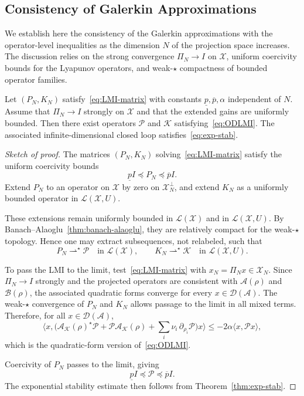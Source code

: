 \documentclass[AMA,Times2COL]{WileyNJDv5}
\begin{document}
\subsection{Consistency of Galerkin Approximations}

We establish here the consistency of the Galerkin approximations with the operator-level inequalities as the dimension $N$ of the projection space increases. The discussion relies on the strong convergence $\Pi_N\to I$ on
$\mathscr{X}$, uniform coercivity bounds for the Lyapunov operators, and weak-$\star$ compactness of bounded operator families.

\begin{theorem}\label{thm:limit}
Let $(P_N,K_N)$ satisfy~\eqref{eq:LMI-matrix} with constants $\underline{p},\overline{p},\alpha$ independent of $N$.
Assume that $\Pi_N\to I$ strongly on $\mathscr{X}$ and that the extended gains are uniformly bounded. Then there exist operators $\mathcal{P}$ and $\mathcal{K}$ satisfying~\eqref{eq:ODLMI}.  
The associated infinite-dimensional closed loop satisfies~\eqref{eq:exp-stab}.
\end{theorem}

\begin{proof}[Sketch of proof]
The matrices $(P_N,K_N)$ solving~\eqref{eq:LMI-matrix} satisfy the uniform coercivity bounds
\[
\underline{p}I\preceq P_N\preceq \overline{p}I .
\]
Extend $P_N$ to an operator on $\mathscr X$ by zero on
$\mathscr X_N^\perp$, and extend $K_N$ as a uniformly bounded operator in $\mathcal L(\mathscr X,U)$.

These extensions remain uniformly bounded in
$\mathcal{L}(\mathscr{X})$ and in $\mathcal L(\mathscr X,U)$. By Banach--Alaoglu~\ref{thm:banach-alaoglu}, they are relatively compact for the weak-$\star$ topology. Hence one may extract subsequences, not relabeled, such
that
\[
P_N \rightharpoonup^\star \mathcal{P}
\quad\text{in }\mathcal{L}(\mathscr{X}),
\qquad
K_N \rightharpoonup^\star \mathcal{K}
\quad\text{in }\mathcal L(\mathscr X,U).
\]

To pass the LMI to the limit, test~\eqref{eq:LMI-matrix} with $x_N=\Pi_N x\in \mathscr X_N$. Since $\Pi_N\to I$ strongly and the projected operators are consistent with $\mathcal A(\rho)$ and $\mathcal B(\rho)$, the associated quadratic forms converge for every $x\in\mathcal D(\mathcal A)$.
The weak-$\star$ convergence of $P_N$ and $K_N$ allows passage to the limit in all mixed terms. Therefore, for all $x\in\mathcal D(\mathcal A)$,
\[
\big\langle x,
\big(
\mathcal A_{\mathcal K}(\rho)^\star\mathcal P
+
\mathcal P\mathcal A_{\mathcal K}(\rho)
+
\sum_i\nu_i\,\partial_{\rho_i}\mathcal P
\big)x
\big\rangle
\le
-2\alpha\langle x,\mathcal P x\rangle ,
\]
which is the quadratic-form version of~\eqref{eq:ODLMI}.

Coercivity of $P_N$ passes to the limit, giving
\[
\underline{p}I\preceq \mathcal{P}\preceq \overline{p}I .
\]
The exponential stability estimate then follows from
Theorem~\ref{thm:exp-stab}.
\end{proof}
\end{document}
